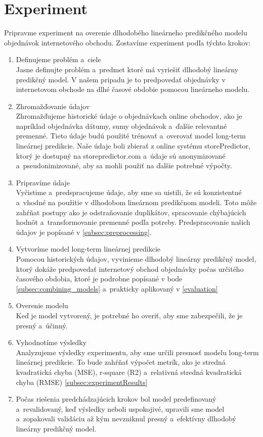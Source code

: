     \section{Experiment}
    Pripravme experiment na overenie dlhodobého lineárneho predikčného modelu objednávok internetového obchodu.
    Zostavíme experiment podľa týchto krokov:
    \begin{enumerate}
        \item Definujeme problém a~ciele\\
        Jasne definujte problém a~predmet ktoré má vyriešiť dlhodobý lineárny\\ predikčný model.
        V našem pripadu je to predpovedať objednávky v internetovom obchode na dlhé časové obdobie
        pomocou lineárneho modelu.
        \item  Zhromažďovanie údajov\\
        Zhromažďujeme historické údaje o objednávkach online obchodov, ako je napríklad
        objednávka dátumy, sumy objednávok a~ďalšie relevantné premenné. Tieto údaje budú použité trénovať a~overovať
        model long-term lineárnej predikcie. Naše údaje boli zbierať z online systému storePredictor,
        ktorý je dostupný na storepredictor.com a~údaje sú anonymizované a~pseudonimizované, aby sa mohli použiť
        na ďalšie potrebné výpočty.
        \item  Pripravíme údaje\\
        Vyčistime a~predspracujeme údaje, aby sme sa uistili, že sú konzistentné a~vhodné na
        použitie v dlhodobom lineárnom predikčnom modeli. Toto môže zahŕňat postupy ako je odstraňovanie duplikátov,
        spracovanie chýbajúcich hodnôt a~transformovanie premenné podľa potreby. Predspracovanie našich údajov
        je popísané v \ref{subsec:preprocessing}.
        \item  Vytvoríme model long-term lineárnej predikcie\\
        Pomocou historických údajov, vyvinieme dlhodobý lineárny predikčný model, ktorý dokáže predpovedať
        internetový obchod objednávky počas určitého časového obdobia, ktoré je podrobne popísané v bode \ref{subsec:combining_models} a~prakticky
        aplikovaný v \ref{evaluation}
        \item  Overenie modelu\\
        Keď je model vytvorený, je potrebné ho overiť, aby sme zabezpečili, že je presný a~účinný.
        \item Vyhodnotíme výsledky\\
        Analyzujeme výsledky experimentu, aby sme určili presnosť modelu long-term lineárnej
        predikcie. To bude zahŕňať výpočet metrík, ako je stredná kvadratická chyba (MSE), r-square (R2) a~relativná stredná
        kvadratická chyba (RMSE) \ref{subsec:experimentResults}
        \item Počas riešenia predchádzajúcich krokov bol model predefinovaný a~revalidovaný, keď výsledky neboli uspokojivé,
        upravili sme model a~zopakovali validáciu až kým nevzniknul presný a~efektívny dlhodobý lineárny predikčný model.
    \end{enumerate}

